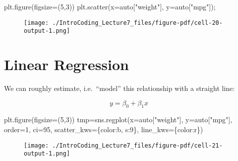 \documentclass[
  letterpaper,
  DIV=11,
  numbers=noendperiod]{scrreprt}
\newenvironment{Shaded}{\begin{snugshade}}{\end{snugshade}}
\newcommand{\DecValTok}[1]{\textcolor[rgb]{0.68,0.00,0.00}{#1}}
\newcommand{\NormalTok}[1]{\textcolor[rgb]{0.00,0.23,0.31}{#1}}
\newcommand{\OperatorTok}[1]{\textcolor[rgb]{0.37,0.37,0.37}{#1}}
\newcommand{\StringTok}[1]{\textcolor[rgb]{0.13,0.47,0.30}{#1}}
\begin{document}
\begin{Shaded}
\begin{Highlighting}[]
\NormalTok{plt.figure(figsize}\OperatorTok{=}\NormalTok{(}\DecValTok{5}\NormalTok{,}\DecValTok{3}\NormalTok{))}
\NormalTok{plt.scatter(x}\OperatorTok{=}\NormalTok{auto[}\StringTok{"weight"}\NormalTok{], y}\OperatorTok{=}\NormalTok{auto[}\StringTok{"mpg"}\NormalTok{])}\OperatorTok{;}
\end{Highlighting}
\end{Shaded}

\begin{figure}[H]

{\centering \texttt{[image: ./IntroCoding\_Lecture7\_files/figure-pdf/cell-20-output-1.png]}

}

\end{figure}

\hypertarget{linear-regression}{%
\section{Linear Regression}\label{linear-regression}}

We can roughly estimate, i.e.~``model'' this relationship with a
straight line:

\[
y = \beta_0 + \beta_1 x
\]

\begin{Shaded}
\begin{Highlighting}[]
\NormalTok{plt.figure(figsize}\OperatorTok{=}\NormalTok{(}\DecValTok{5}\NormalTok{,}\DecValTok{3}\NormalTok{))}
\NormalTok{tmp}\OperatorTok{=}\NormalTok{sns.regplot(x}\OperatorTok{=}\NormalTok{auto[}\StringTok{"weight"}\NormalTok{], y}\OperatorTok{=}\NormalTok{auto[}\StringTok{"mpg"}\NormalTok{], order}\OperatorTok{=}\DecValTok{1}\NormalTok{, ci}\OperatorTok{=}\DecValTok{95}\NormalTok{, }
\NormalTok{                scatter\_kws}\OperatorTok{=}\NormalTok{\{}\StringTok{\textquotesingle{}color\textquotesingle{}}\NormalTok{:}\StringTok{\textquotesingle{}b\textquotesingle{}}\NormalTok{, }\StringTok{\textquotesingle{}s\textquotesingle{}}\NormalTok{:}\DecValTok{9}\NormalTok{\}, line\_kws}\OperatorTok{=}\NormalTok{\{}\StringTok{\textquotesingle{}color\textquotesingle{}}\NormalTok{:}\StringTok{\textquotesingle{}r\textquotesingle{}}\NormalTok{\})}
\end{Highlighting}
\end{Shaded}

\begin{figure}[H]

{\centering \texttt{[image: ./IntroCoding\_Lecture7\_files/figure-pdf/cell-21-output-1.png]}

}

\end{figure}
\end{document}
